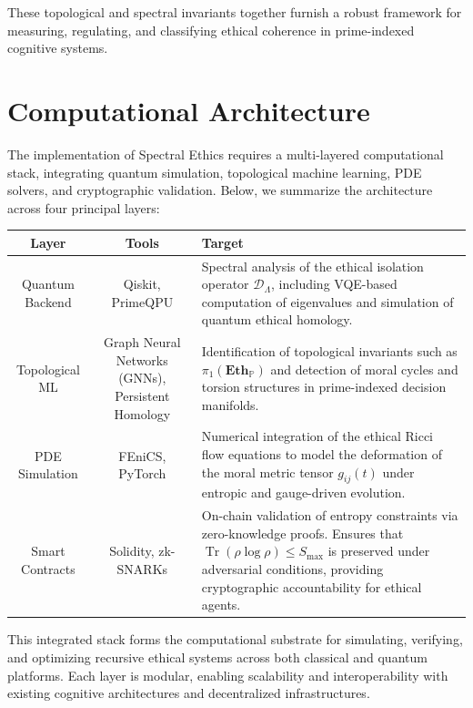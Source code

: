 \documentclass{article}
\theoremstyle{plain}
\theoremstyle{claimstyle}
\begin{document}
These topological and spectral invariants together furnish a robust framework for measuring, regulating, and classifying ethical coherence in prime-indexed cognitive systems.


\section{Computational Architecture}

The implementation of Spectral Ethics requires a multi-layered computational stack, integrating quantum simulation, topological machine learning, PDE solvers, and cryptographic validation. Below, we summarize the architecture across four principal layers:

\begin{center}
\begin{tabular}{|c|c|p{7cm}|}
\hline
\textbf{Layer} & \textbf{Tools} & \textbf{Target} \\
\hline
Quantum Backend & Qiskit, PrimeQPU & Spectral analysis of the ethical isolation operator $\mathcal{D}_\Lambda$, including VQE-based computation of eigenvalues and simulation of quantum ethical homology. \\
\hline
Topological ML & Graph Neural Networks (GNNs), Persistent Homology & Identification of topological invariants such as $\pi_1(\mathbf{Eth}_{\mathbb{P}})$ and detection of moral cycles and torsion structures in prime-indexed decision manifolds. \\
\hline
PDE Simulation & FEniCS, PyTorch & Numerical integration of the ethical Ricci flow equations to model the deformation of the moral metric tensor $g_{ij}(t)$ under entropic and gauge-driven evolution. \\
\hline
Smart Contracts & Solidity, zk-SNARKs & On-chain validation of entropy constraints via zero-knowledge proofs. Ensures that $\operatorname{Tr}(\rho \log \rho) \leq S_{\max}$ is preserved under adversarial conditions, providing cryptographic accountability for ethical agents. \\
\hline
\end{tabular}
\end{center}

This integrated stack forms the computational substrate for simulating, verifying, and optimizing recursive ethical systems across both classical and quantum platforms. Each layer is modular, enabling scalability and interoperability with existing cognitive architectures and decentralized infrastructures.
\end{document}
